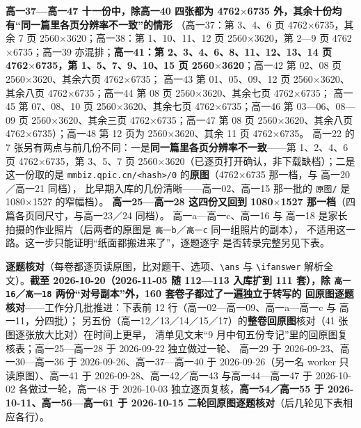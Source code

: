 \documentclass[a4paper,11pt]{article}
\begin{document}
\textbf{高一37---高一47 十一份中，除高一40 四张都为 4762$\times$6735 外，其余十份均有``同一篇里各页分辨率不一致''的情形}
（高一37：第 3、4、6 页 4762$\times$6735，其余 7 页 2560$\times$3620；高一38：第 1、10、11、12 页
2560$\times$3620，第 2---9 页 4762$\times$6735；高一39 亦混排；\textbf{高一41：第 2、3、4、6、8、11、12、13、14 页
4762$\times$6735，第 1、5、7、9、10、15 页 2560$\times$3620}；高一42 第 02、08 页 2560$\times$3620、其余六页 4762$\times$6735；
高一43 第 01、05、09、12 页 2560$\times$3620、其余八页 4762$\times$6735；高一44 第 08 页 2560$\times$3620、其余七页 4762$\times$6735；
高一45 第 07、08、10 页 2560$\times$3620、其余七页 4762$\times$6735；高一46 第 03---06、08---09 页 2560$\times$3620、其余三页 4762$\times$6735；高一47 第 08 页 2560$\times$3620、其余八页 4762$\times$6735）；高一48 第 12 页为 2560$\times$3620、其余 11 页 4762$\times$6735。
高一22 的 7 张另有两点与前几份不同：一是\textbf{同一篇里各页分辨率不一致}------第 1、2、4、6 页
4762$\times$6735，第 3、5、7 页 2560$\times$3620（已逐页打开确认，非下载缺档）；二是这一份取的是
\texttt{mmbiz.qpic.cn/\allowbreak{}\textless{}hash\textgreater{}/\allowbreak{}0} 的\textbf{原图}（4762$\times$6735 那一档，与 高一20／高一21 同档），
比早期入库的几份清晰------高一02、高一15 那一批的 \texttt{原图/\allowbreak{}} 是 1080$\times$1527 的窄幅档）。
\textbf{高一25---高一28 这四份又回到 1080$\times$1527 那一档}（四篇各页同尺寸，与高一23／24 同档）。
高一a---高一c、高一16 与 高一18 是家长拍摄的作业照片（后两者的原图是 \texttt{高一b}／\texttt{高一c} 同一组照片的副本），
不适用这一路。这一步只能证明``纸面都搬进来了''，逐题逐字
是否转录完整另见下表。

\textbf{逐题核对}（每卷都逐页读原图，比对题干、选项、\texttt{\textbackslash{}ans} 与 \texttt{\textbackslash{}ifanswer} 解析全文）。\textbf{截至
2026-10-20（2026-11-05 随 112---113 入库扩到 111 套），除 \texttt{高一16}／\texttt{高一18} 两份``对号副本''外，160 套卷子都过了一遍独立于转写的
回原图逐题核对}------工作分几批推进：下表前 12 行（高一02---高一09、高一a---高一c 与 高一11，分四批）；
另五份（高一12／13／14／15／17）的\textbf{整卷回原图}核对（41 张图逐张放大比对）在时间上更早，
清单见文末``9 月中旬五份专记''里的回原图复核表；高一25---高一28 于 2026-09-22 独立做过一轮、
高一29 于 2026-09-23、高一30---高一36 于 2026-09-26、高一37---高一40 于 2026-09-26（另一名
worker 只读原图）、高一41 于 2026-09-28、高一42／高一43 与高一44---高一47 于 2026-10-02 各做过一轮，高一48 于 2026-10-03 独立逐页复核，\textbf{高一54／高一55 于 2026-10-11、高一56---高一61 于 2026-10-15 二轮回原图逐题核对}（后几轮见下表相应各行）。
\end{document}
